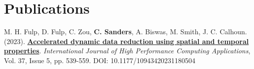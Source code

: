 \section{\textbf{Publications}}
\vspace{-0.4mm}
\small{
\resumeSubHeadingListStart

\item[] M. H. Fulp, D. Fulp, C. Zou, \textbf{C. Sanders}, A. Biswas, M. Smith, J. C. Calhoun. (2023). \href{https://doi.org/10.1177/10943420231180504}{\textbf{Accelerated dynamic data reduction using spatial and temporal properties}}. \textit{International Journal of High Performance Computing Applications}, Vol. 37, Issue 5, pp. 539-559. DOI: 10.1177/10943420231180504

\resumeSubHeadingListEnd
}
\vspace{-6mm}
